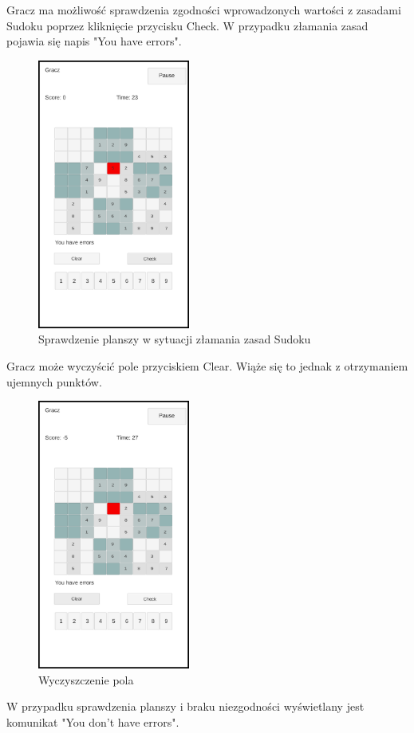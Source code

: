\documentclass[a4paper, 11pt]{article}
\begin{document}
Gracz ma możliwość sprawdzenia zgodności wprowadzonych wartości z zasadami Sudoku poprzez kliknięcie przycisku Check. W przypadku złamania zasad pojawia się napis "You have errors".
\begin{figure}[H]
	\centering
	\includegraphics[width=5cm]{zrzuty/7.png}
	\caption{Sprawdzenie planszy w sytuacji złamania zasad Sudoku}
	\label{fig:check_errors}
\end{figure}
Gracz może wyczyścić pole przyciskiem Clear. Wiąże się to jednak z otrzymaniem ujemnych punktów.
\begin{figure}[H]
	\centering
	\includegraphics[width=5cm]{zrzuty/8.png}
	\caption{Wyczyszczenie pola}
	\label{fig:clear}
\end{figure}
W przypadku sprawdzenia planszy i braku niezgodności wyświetlany jest komunikat "You don't have errors".
\end{document}
